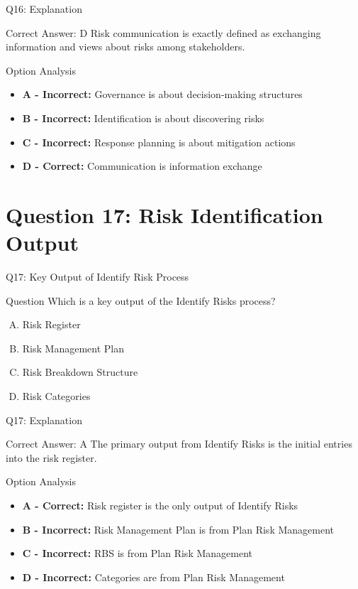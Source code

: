 \documentclass{beamer}
\begin{document}
	\begin{frame}{Q16: Explanation}
		\begin{block}{Correct Answer: D}
			Risk communication is exactly defined as exchanging information and views about risks among stakeholders.
		\end{block}
		\begin{block}{Option Analysis}
			\begin{itemize}
				\item \textbf{A - Incorrect:} Governance is about decision-making structures
				\item \textbf{B - Incorrect:} Identification is about discovering risks
				\item \textbf{C - Incorrect:} Response planning is about mitigation actions
				\item \textbf{D - Correct:} Communication is information exchange
			\end{itemize}
		\end{block}
	\end{frame}
	
	\section{Question 17: Risk Identification Output}
	
	\begin{frame}{Q17: Key Output of Identify Risk Process}
		\begin{block}{Question}
			Which is a key output of the Identify Risks process?
		\end{block}
		\begin{enumerate}[(A)]
			\item Risk Register
			\item Risk Management Plan
			\item Risk Breakdown Structure
			\item Risk Categories
		\end{enumerate}
	\end{frame}
	
	\begin{frame}{Q17: Explanation}
		\begin{block}{Correct Answer: A}
			The primary output from Identify Risks is the initial entries into the risk register.
		\end{block}
		\begin{block}{Option Analysis}
			\begin{itemize}
				\item \textbf{A - Correct:} Risk register is the only output of Identify Risks
				\item \textbf{B - Incorrect:} Risk Management Plan is from Plan Risk Management
				\item \textbf{C - Incorrect:} RBS is from Plan Risk Management
				\item \textbf{D - Incorrect:} Categories are from Plan Risk Management
			\end{itemize}
		\end{block}
	\end{frame}
	
\end{document}
